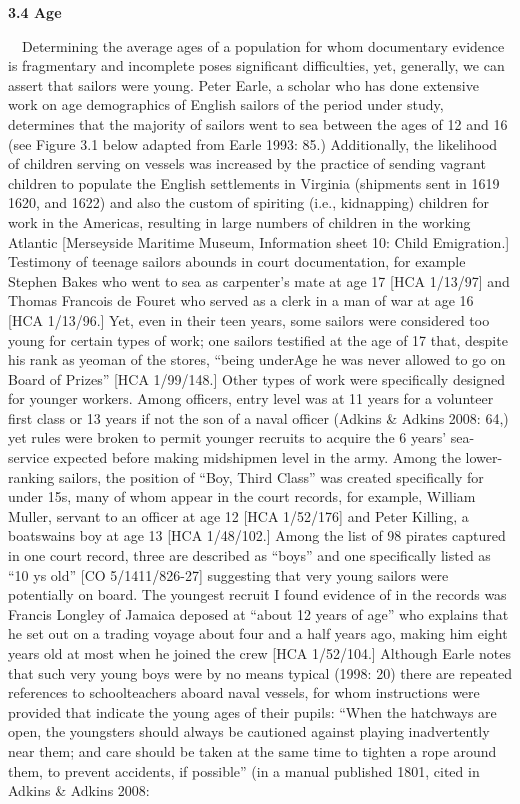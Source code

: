 \documentclass[12pt]{article}
\newenvironment{styleStandard}{\renewcommand\baselinestretch{1.0}\setlength\leftskip{0cm}\setlength\rightskip{0cm plus 1fil}\setlength\parindent{0cm}\setlength\parfillskip{0pt plus 1fil}\setlength\parskip{0in plus 1pt}\writerlistparindent\writerlistleftskip\leavevmode\normalfont\normalsize\writerlistlabel\ignorespaces}{\unskip\vspace{0in plus 1pt}\par}
\newcommand\writerlistleftskip{}
\newcommand\writerlistparindent{}
\newcommand\writerlistlabel{}
\begin{document}
\begin{styleStandard}
\textbf{3.4 Age}
\end{styleStandard}


\begin{styleStandard}
\ \ Determining the average ages of a population for whom documentary evidence is fragmentary and incomplete poses significant difficulties, yet, generally, we can assert that sailors were young. Peter Earle, a scholar who has done extensive work on age demographics of English sailors of the period under study, determines that the majority of sailors went to sea between the ages of 12 and 16 (see Figure 3.1 below adapted from Earle 1993: 85.) Additionally, the likelihood of children serving on vessels was increased by the practice of sending vagrant children to populate the English settlements in Virginia (shipments sent in 1619 1620, and 1622) and also the custom of spiriting (i.e., kidnapping) children for work in the Americas, resulting in large numbers of children in the working Atlantic [Merseyside Maritime Museum, Information sheet 10: Child Emigration.] Testimony of teenage sailors abounds in court documentation, for example Stephen Bakes who went to sea as carpenter’s mate at age 17 [HCA 1/13/97] and Thomas Francois de Fouret who served as a clerk in a man of war at age 16 [HCA 1/13/96.] Yet, even in their teen years, some sailors were considered too young for certain types of work; one sailors testified at the age of 17 that, despite his rank as yeoman of the stores, “being underAge he was never allowed to go on Board of Prizes” [HCA 1/99/148.] Other types of work were specifically designed for younger workers. Among officers, entry level was at 11 years for a volunteer first class or 13 years if not the son of a naval officer (Adkins \& Adkins 2008: 64,) yet rules were broken to permit younger recruits to acquire the 6 years’ sea-service expected before making midshipmen level in the army. Among the lower-ranking sailors, the position of “Boy, Third Class” was created specifically for under 15s, many of whom appear in the court records, for example, William Muller, servant to an officer at age 12 [HCA 1/52/176] and Peter Killing, a boatswain{\textquotesingle}s boy at age 13 [HCA 1/48/102.] Among the list of 98 pirates captured in one court record, three are described as “boys” and one specifically listed as “10 ys old” [CO 5/1411/826-27] suggesting that very young sailors were potentially on board. The youngest recruit I found evidence of in the records was Francis Longley of Jamaica deposed at “about 12 years of age” who explains that he set out on a trading voyage about four and a half years ago, making him eight years old at most when he joined the crew [HCA 1/52/104.] Although Earle notes that such very young boys were by no means typical (1998: 20) there are repeated references to schoolteachers aboard naval vessels, for whom instructions were provided that indicate the young ages of their pupils: “When the hatchways are open, the youngsters should always be cautioned against playing inadvertently near them; and care should be taken at the same time to tighten a rope around them, to prevent accidents, if possible” (in a manual published 1801, cited in Adkins \& Adkins 2008: 
\end{styleStandard}
\end{document}
